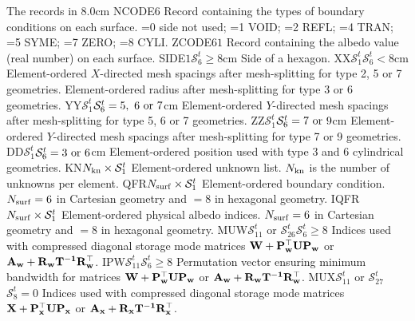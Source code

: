 \begin{DescriptionEnregistrement}{The  records in
}{8.0cm}
\IntEnr
  {NCODE}{$6$}
  {Record containing the types of boundary conditions on each surface. =0 side
   not used; =1 VOID; =2 REFL; =4 TRAN; =5 SYME; =7 ZERO; =8 CYLI.} 
\RealEnr
  {ZCODE}{$6$}{$1$}
  {Record containing the albedo value (real number) on each surface.} 
\OptRealEnr
  {SIDE}{$1$}{$\mathcal{S}^{t}_{6}\ge 8$}{cm}
  {Side of a hexagon.} 
\OptRealEnr
  {XX}{$\mathcal{S}^{t}_{1}$}{$\mathcal{S}^{t}_{6}<8$}{cm}
  {Element-ordered $X$-directed mesh spacings after mesh-splitting for type 2, 5
   or 7 geometries. Element-ordered radius after mesh-splitting for type 3
   or 6 geometries.} 
\OptRealEnr
  {YY}{$\mathcal{S}^{t}_{1}$}{$\mathcal{S}^{t}_{6}=5, \ 6 \ {\rm or} \ 7$}{cm}
  {Element-ordered $Y$-directed mesh spacings after mesh-splitting for type 5, 6
   or 7 geometries.} 
\OptRealEnr
  {ZZ}{$\mathcal{S}^{t}_{1}$}{$\mathcal{S}^{t}_{6}=7 \ {\rm or} \ 9$}{cm}
  {Element-ordered $Y$-directed mesh spacings after mesh-splitting for type 7
   or 9 geometries.} 
\OptRealEnr
  {DD}{$\mathcal{S}^{t}_{1}$}{$\mathcal{S}^{t}_{6}=3 \ {\rm or} \ 6$}{cm}
  {Element-ordered position used with type 3 and 6 cylindrical geometries.} 
\IntEnr
  {KN}{$N_{\rm kn}\times\mathcal{S}^{t}_{1}$}
  {Element-ordered unknown list. $N_{\rm kn}$ is the number of unknowns per element.} 
\RealEnr
  {QFR}{$N_{\rm surf}\times\mathcal{S}^{t}_{1}$}{}
  {Element-ordered boundary condition. $N_{\rm surf}=6$ in Cartesian geometry and $=8$ in hexagonal geometry.} 
\IntEnr
  {IQFR}{$N_{\rm surf}\times\mathcal{S}^{t}_{1}$}
  {Element-ordered physical albedo indices. $N_{\rm surf}=6$ in Cartesian geometry and $=8$ in hexagonal geometry.} 
\OptIntEnr
  {MUW}{$\mathcal{S}^{t}_{11}$ or $\mathcal{S}^{t}_{26}$}{$\mathcal{S}^{t}_{6}\ge 8$}
  {Indices used with compressed diagonal storage mode matrices $\bf{W}+\bf{P}_w^\top \bf{U}\bf{P}_w$ or $\bf{A}_w+\bf{R}_w\bf{T}^{-1}\bf{R}_w^\top$.} 
\OptIntEnr
  {IPW}{$\mathcal{S}^{t}_{11}$}{$\mathcal{S}^{t}_{6}\ge 8$}
  {Permutation vector ensuring minimum bandwidth for matrices $\bf{W}+\bf{P}_w^\top \bf{U}\bf{P}_w$ or $\bf{A}_w+\bf{R}_w\bf{T}^{-1}\bf{R}_w^\top$.} 
\OptIntEnr
  {MUX}{$\mathcal{S}^{t}_{11}$ or $\mathcal{S}^{t}_{27}$}{$\mathcal{S}^{t}_{8}=0$}
  {Indices used with compressed diagonal storage mode matrices $\bf{X}+\bf{P}_x^\top \bf{U}\bf{P}_x$ or $\bf{A}_x+\bf{R}_x\bf{T}^{-1}\bf{R}_x^\top$.} 
\IntEnr

\end{DescriptionEnregistrement}
